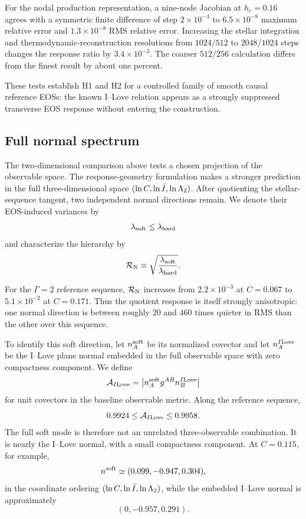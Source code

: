 For the nodal production representation, a nine-node Jacobian at
\(h_c=0.16\) agrees with a symmetric finite difference of step
\(2\times10^{-4}\) to \(6.5\times10^{-8}\) maximum relative error and
\(1.3\times10^{-8}\) RMS relative error.  Increasing the stellar integration
and thermodynamic-reconstruction resolutions from \(1024/512\) to
\(2048/1024\) steps changes the response ratio by \(3.4\times10^{-3}\).
The coarser \(512/256\) calculation differs from the finest result by about
one percent.

These tests establish H1 and H2 for a controlled family of smooth causal
reference EOSs: the known I--Love relation appears as a strongly suppressed
transverse EOS response without entering the construction.

\subsection{Full normal spectrum}

The two-dimensional comparison above tests a chosen projection of the
observable space.  The response-geometry formulation makes a stronger
prediction in the full three-dimensional space
\((\ln C,\ln\bar I,\ln\Lambda_2)\).  After quotienting the stellar-sequence
tangent, two independent normal directions remain.  We denote their
EOS-induced variances by
\[
    \lambda_{\rm soft}\le\lambda_{\rm hard}
\]
and characterize the hierarchy by
\begin{equation}
    \mathcal R_{\rm N}
    \equiv
    \sqrt{
      \frac{\lambda_{\rm soft}}
           {\lambda_{\rm hard}}
    }.
    \label{eq:normal-spectrum-ratio}
\end{equation}

For the \(\Gamma=2\) reference sequence,
\(\mathcal R_{\rm N}\) increases from \(2.2\times10^{-3}\) at
\(C=0.067\) to \(5.1\times10^{-2}\) at \(C=0.171\).  Thus the quotient
response is itself strongly anisotropic: one normal direction is between
roughly \(20\) and \(460\) times quieter in RMS than the other over this
sequence.

To identify this soft direction, let \(n_A^{\rm soft}\) be its normalized
covector and let \(n_A^{I{\rm Love}}\) be the I--Love plane normal embedded
in the full observable space with zero compactness component.  We define
\begin{equation}
    \mathcal A_{I{\rm Love}}
    =
    \left|
      n_A^{\rm soft}
      g^{AB}
      n_B^{I{\rm Love}}
    \right|
\end{equation}
for unit covectors in the baseline observable metric.  Along the reference
sequence,
\[
    0.9924\le \mathcal A_{I{\rm Love}}\le0.9958.
\]
The full soft mode is therefore not an unrelated three-observable
combination.  It is nearly the I--Love normal, with a small compactness
component.  At \(C=0.115\), for example,
\begin{equation}
    n^{\rm soft}
    \simeq
    (0.099,-0.947,0.304),
\end{equation}
in the coordinate ordering
\((\ln C,\ln\bar I,\ln\Lambda_2)\), while the embedded I--Love normal is
approximately
\[
    (0,-0.957,0.291).
\]

